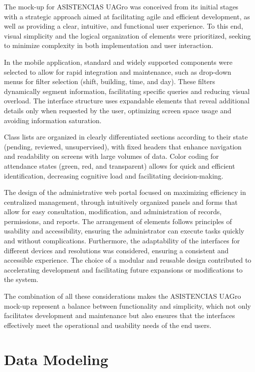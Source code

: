 \documentclass[journal=information,article,submit,pdftex,oneauthor]{Definitions/mdpi}
\begin{document}
	The mock-up for ASISTENCIAS UAGro was conceived from its initial stages with a strategic approach aimed at facilitating agile and efficient development, as well as providing a clear, intuitive, and functional user experience. To this end, visual simplicity and the logical organization of elements were prioritized, seeking to minimize complexity in both implementation and user interaction.
	
	In the mobile application, standard and widely supported components were selected to allow for rapid integration and maintenance, such as drop-down menus for filter selection (shift, building, time, and day). These filters dynamically segment information, facilitating specific queries and reducing visual overload. The interface structure uses expandable elements that reveal additional details only when requested by the user, optimizing screen space usage and avoiding information saturation.
	
	Class lists are organized in clearly differentiated sections according to their state (pending, reviewed, unsupervised), with fixed headers that enhance navigation and readability on screens with large volumes of data. Color coding for attendance states (green, red, and transparent) allows for quick and efficient identification, decreasing cognitive load and facilitating decision-making.
	
	The design of the administrative web portal focused on maximizing efficiency in centralized management, through intuitively organized panels and forms that allow for easy consultation, modification, and administration of records, permissions, and reports. The arrangement of elements follows principles of usability and accessibility, ensuring the administrator can execute tasks quickly and without complications. Furthermore, the adaptability of the interfaces for different devices and resolutions was considered, ensuring a consistent and accessible experience. The choice of a modular and reusable design contributed to accelerating development and facilitating future expansions or modifications to the system.
	
	The combination of all these considerations makes the ASISTENCIAS UAGro mock-up represent a balance between functionality and simplicity, which not only facilitates development and maintenance but also ensures that the interfaces effectively meet the operational and usability needs of the end users.

	\section{Data Modeling}
	
\end{document}

